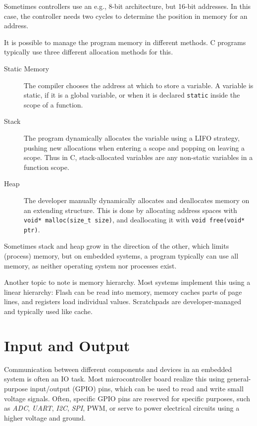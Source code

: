 Sometimes controllers use an e.g., 8-bit architecture, but 16-bit addresses.
In this case, the controller needs two cycles to determine the position in memory for an address.

It is possible to manage the program memory in different methods.
C programs typically use three different allocation methods for this.
\begin{description}
    \item[Static Memory] The compiler chooses the address at which to store a variable.
        A variable is static, if it is a global variable, or when it is declared \lstinline|static| inside the scope of a function.

    \item[Stack] The program dynamically allocates the variable using a LIFO strategy, pushing new allocations when entering a scope and popping on leaving a scope.
        Thus in C, stack-allocated variables are any non-static variables in a function scope.

    \item[Heap] The developer manually dynamically allocates and deallocates memory on an extending structure.
        This is done by allocating address spaces with \lstinline|void* malloc(size_t size)|, and deallocating it with \lstinline|void free(void* ptr)|.
\end{description}
Sometimes stack and heap grow in the direction of the other, which limits (process) memory, but on embedded systems, a program typically can use all memory, as neither operating system nor processes exist.

Another topic to note is memory hierarchy.
Most systems implement this using a linear hierarchy: Flash can be read into memory, memory caches parts of page lines, and registers load individual values.
Scratchpads are developer-managed and typically used like cache.

\section{Input and Output}
Communication between different components and devices in an embedded system is often an IO task.
Most microcontroller board realize this using general-purpose input/output (GPIO) pins, which can be used to read and write small voltage signals.
Often, specific GPIO pins are reserved for specific purposes, such as \emph{ADC}, \emph{UART}, \emph{I2C}, \emph{SPI}, PWM, or serve to power electrical circuits using a higher voltage and ground.

